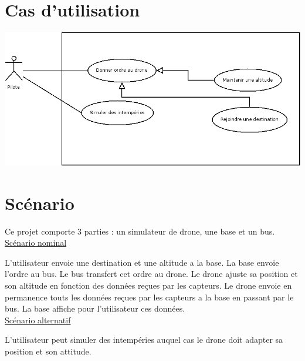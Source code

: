 \documentclass[12pt,a4paper]{article}
\begin{document}
\section{Cas d'utilisation}

\includegraphics[width=1\textwidth]{images/Diagramme1.png}\\[1cm]    



\section{Scénario}
Ce projet comporte 3 parties : un simulateur de drone, une base et un bus.\\


\underline{Scénario nominal}

L'utilisateur envoie une destination et une altitude a la base.
La base envoie l'ordre au bus.
Le bus transfert cet ordre au drone.
Le drone ajuste sa position et son altitude en fonction des données reçues par les capteurs.
Le drone envoie en permanence touts les données reçues par les capteurs a la base en passant par le bus.
La base affiche pour l'utilisateur ces données.\\

\underline{Scénario alternatif}

L'utilisateur peut simuler des intempéries auquel cas le drone doit adapter sa position et son attitude.
\end{document}
